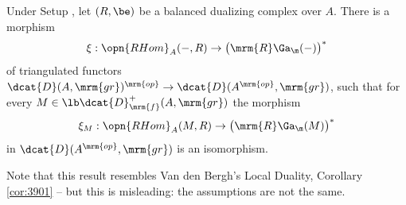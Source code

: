\begin{thm} \label{thm:4616}
Under Setup \tup{\ref{setup:3925}}, let 
$(R, \be)$ be a balanced dualizing complex over $A$.
There is a morphism
\[ \xi : \opn{RHom}_A(-, R) \to \bigl( \mrm{R} \Ga_{\m} (-) \bigr)^* \] 
of triangulated functors 
$\dcat{D}(A, \mrm{gr})^{\mrm{op}} \to \dcat{D}(A^{\mrm{op}}, \mrm{gr})$,
such that for every 
$M \in \lb \dcat{D}^{+}_{\mrm{f}}(A, \mrm{gr})$ 
the morphism 
\[ \xi_M : \opn{RHom}_A(M, R) \to \bigl( \mrm{R} \Ga_{\m} (M) \bigr)^* \]
in $\dcat{D}(A^{\mrm{op}}, \mrm{gr})$
is an isomorphism. 
\end{thm}

Note that this result resembles Van den Bergh's Local Duality, Corollary 
\ref{cor:3901} -- but this is misleading: the assumptions are not the same. 

